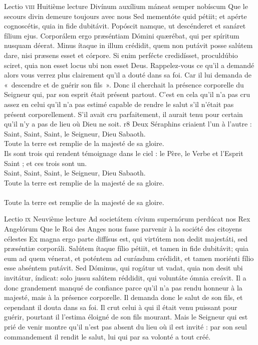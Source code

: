 \documentclass[twoside]{article}
\begin{document}
\begin{paracol}[1]{2}
\lectioresponsorium
	{Lectio \textsc{viii}}
	{Huitième lecture}
	{Divínum auxílium máneat semper nobíscum}
	{Que le secours divin demeure toujours avec nous}
	{
		Sed mementóte quid pétiit; et apérte cognoscétis, quia in fide dubitávit. Popóscit namque, ut descénderet et sanáret fílium ejus. Corporálem ergo præséntiam Dómini quærébat, qui per spíritum nusquam déerat. Minus ítaque in illum crédidit, quem non putávit posse salútem dare, nisi præsens esset et córpore. Si enim perfécte credidísset, proculdúbio sciret, quia non esset locus ubi non esset Deus.
	}
	{
		Rappelez-vous ce qu’il a demandé alors vous verrez plus clairement qu’il a douté dans sa foi. Car il lui demanda de «~descendre et de guérir son fils~». Donc il cherchait la présence corporelle du Seigneur qui, par son esprit était présent partout. C’est en cela qu’il n’a pas cru assez en celui qu’il n’a pas estimé capable de rendre le salut s’il n’était pas présent corporellement. S’il avait cru parfaitement, il aurait tenu pour certain qu’il n’y a pas de lieu où Dieu ne soit.
	}
	{r8}
	{\rr Deux Séraphins criaient l'un à l'autre :\\
	\GreSpecial{*} Saint, Saint, Saint, le Seigneur, Dieu Sabaoth.\\
	\GreSpecial{+} Toute la terre est remplie de la majesté de sa gloire.\\
	\vv Ils sont trois qui rendent témoignage dans le ciel : le Père, le Verbe et l’Esprit Saint ; et ces trois sont un.\\
	\GreSpecial{*} Saint, Saint, Saint, le Seigneur, Dieu Sabaoth.\\
	\GreSpecial{+} Toute la terre est remplie de la majesté de sa gloire.\\
	\versetGloireAuPere{}\\
	\GreSpecial{+} Toute la terre est remplie de la majesté de sa gloire.}
	
\lectioresponsorium
	{Lectio \textsc{ix}}
	{Neuvième lecture}
	{Ad societátem cívium supernórum perdúcat nos Rex Angelórum}
	{Que le Roi des Anges nous fasse parvenir à la société des citoyens célestes}
	{
		Ex magna ergo parte diffísus est, qui virtútem non dedit majestáti, sed præséntiæ corporáli. Salútem ítaque fílio pétiit, et tamen in fide dubitávit; quia eum ad quem vénerat, et poténtem ad curándum crédidit, et tamen moriénti fílio esse abséntem putávit. Sed Dóminus, qui rogátur ut vadat, quia non desit ubi invitátur, índicat: solo jussu salútem réddidit, qui voluntáte ómnia creávit.
	}
	{
		Il a donc grandement manqué de confiance parce qu’il n’a pas rendu honneur à la majesté, mais à la présence corporelle. Il demanda donc le salut de son fils, et cependant il douta dans sa foi. Il crut celui à qui il était venu puissant pour guérir, pourtant il l’estima éloigné de son fils mourant. Mais le Seigneur qui est prié de venir montre qu’il n’est pas absent du lieu où il est invité : par son seul commandement il rendit le salut, lui qui par sa volonté a tout créé.
	}
	{}
	{}
	

\end{paracol}
\end{document}
